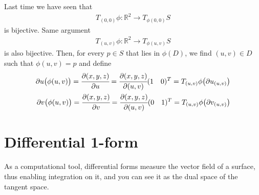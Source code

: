\documentclass[10pt]{article}
\begin{document}
            \vspace{-0.3cm}
		\begin{definition}
			Last time we have seen that
			\begin{equation*}
				\begin{aligned}
					T_{(0,0)}\phi: \mathbb{R}^2\rightarrow T_{\phi(0, 0)}S
				\end{aligned}
			\end{equation*}
			is bijective. Same argument
			\begin{equation*}
				\begin{aligned}
					T_{(u, v)}\phi: \mathbb{R}^2\rightarrow T_{\phi(u, v)}S
				\end{aligned}
			\end{equation*}
			is also bijective. Then, for every $p\in S$ that lies in $\phi(D)$, we find $(u, v)\in D$ such that $\phi(u, v) = p$ and define
			\begin{equation*}
				\begin{aligned}
					\partial u\big(\phi(u, v)\big) = \cfrac{\partial(x,y,z)}{\partial u} = \cfrac{\partial(x,y,z)}{\partial(u,v)}(1\quad 0)^T = T_{(u,v)}\phi\big(\partial u_{(u,v)}\big) \\
					\partial v\big(\phi(u, v)\big) = \cfrac{\partial(x,y,z)}{\partial v} = \cfrac{\partial(x,y,z)}{\partial(u,v)}(0\quad 1)^T = T_{(u,v)}\phi\big(\partial v_{(u,v)}\big)
				\end{aligned}
			\end{equation*} 
		\end{definition}



















	\section{Differential 1-form}\label{Sec:Differential 1-form}
		As a computational tool, differential forms measure the vector field of a surface, thus enabling integration on it, and you can see it as the dual space of the tangent space.
	
\end{document}
